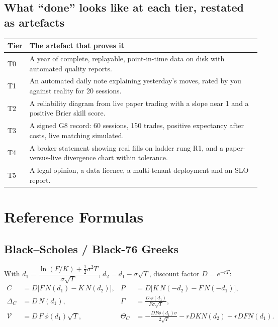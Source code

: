 \section{What ``done'' looks like at each tier, restated as artefacts}

\begin{longtable}{@{}p{1.6cm}p{13.0cm}@{}}
\toprule
\textbf{Tier} & \textbf{The artefact that proves it}\\
\midrule
T0 & A year of complete, replayable, point-in-time data on disk with automated
quality reports.\\
T1 & An automated daily note explaining yesterday's moves, rated by you against
reality for 20 sessions.\\
T2 & A reliability diagram from live paper trading with a slope near 1 and a
positive Brier skill score.\\
T3 & A signed G8 record: 60 sessions, 150 trades, positive expectancy after
costs, live matching simulated.\\
T4 & A broker statement showing real fills on ladder rung R1, and a paper-versus-live
divergence chart within tolerance.\\
T5 & A legal opinion, a data licence, a multi-tenant deployment and an SLO
report.\\
\bottomrule
\end{longtable}

\appendix
\chapter{Reference Formulas}

\section*{Black--Scholes / Black-76 Greeks}
With $d_1 = \dfrac{\ln(F/K) + \tfrac{1}{2}\sigma^2 T}{\sigma\sqrt{T}}$,
$d_2 = d_1 - \sigma\sqrt{T}$, discount factor $D = e^{-rT}$:
\[
\begin{aligned}
C &= D\big[F\,N(d_1) - K\,N(d_2)\big], &
P &= D\big[K\,N(-d_2) - F\,N(-d_1)\big],\\
\Delta_C &= D\,N(d_1), &
\Gamma &= \frac{D\,\phi(d_1)}{F\sigma\sqrt{T}},\\
\mathcal{V} &= D\,F\,\phi(d_1)\sqrt{T}, &
\Theta_C &= -\frac{D F \phi(d_1)\sigma}{2\sqrt{T}} - rDKN(d_2)+rDFN(d_1).
\end{aligned}
\]

